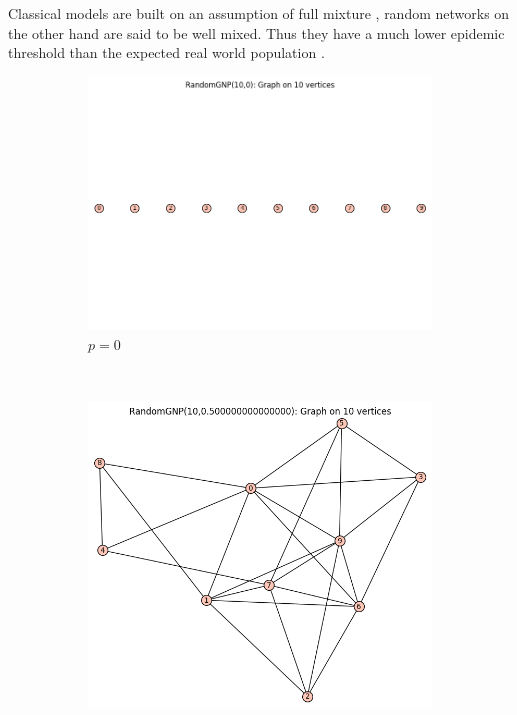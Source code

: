 Classical models are built on an assumption of full mixture , random networks on the other hand are said to be well mixed. Thus they have a much lower epidemic threshold than the expected real world population \citep{witten2007simulations}.
\begin{figure}[h]
    \centering
    \begin{subfigure}[b]{0.3\textwidth}
        \includegraphics[scale=0.3]{images/rgraph2.png} 
        \caption{ $p =0$}
        \label{fig:a}
    \end{subfigure}
    ~ %
    \begin{subfigure}[b]{0.3\textwidth}
        \includegraphics[width=\textwidth]{images/rgraph1.png}

\end{subfigure}
\end{figure}
